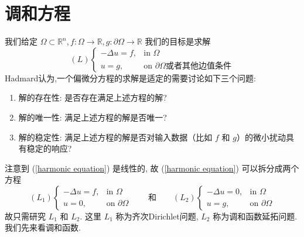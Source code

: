 \documentclass[11pt]{ctexart}[UTF8]
\begin{document}
\section{调和方程}
我们给定 $\Omega \subset \mathbb{R}^n, f: \Omega \longrightarrow \mathbb{R},g: \partial\Omega \longrightarrow \mathbb{R}$ 我们的目标是求解
\begin{equation}\label{harmonic equation}
    (L)\begin{cases}
    -\Delta u = f, & \text{in } \Omega\\
    u = g, & \text{on } \partial\Omega\text{或者其他边值条件}
    \end{cases}
\end{equation} 
Hadmard认为,一个偏微分方程的求解是适定的需要讨论如下三个问题:
\begin{enumerate}
    \item 解的存在性: 是否存在满足上述方程的解?
    \item 解的唯一性: 满足上述方程的解是否唯一?
    \item 解的稳定性: 满足上述方程的解是否对输入数据（比如 $f$ 和 $g$）的微小扰动具有稳定的响应?
\end{enumerate}
注意到 (\ref{harmonic equation}) 是线性的, 故 (\ref{harmonic equation}) 可以拆分成两个方程
\begin{equation*}
    (L_{1})\begin{cases}
    -\Delta u = f, & \text{in } \Omega\\
    u = 0, & \text{on } \partial\Omega
    \end{cases}\quad\quad\text{和}\quad\quad(L_{2})\begin{cases}
    -\Delta u = 0, & \text{in } \Omega\\
    u = g, & \text{on } \partial\Omega
    \end{cases}
\end{equation*}
故只需研究 $L_{1}$ 和 $L_{2}$. 这里 $L_{1}$ 称为齐次Dirichlet问题, $L_{2}$ 称为调和函数延拓问题.
我们先来看调和函数.
\end{document}
